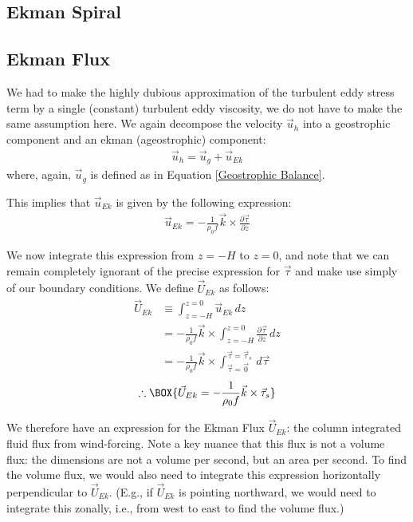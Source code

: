 \subsection{Ekman Spiral}



\subsection{Ekman Flux}

We had to make the highly dubious approximation of the turbulent eddy stress term by a single (constant) turbulent eddy viscosity, we do not have to make the same assumption here. We again decompose the velocity $\vec{u}_h$ into a geostrophic component and an ekman (ageostrophic) component:
\begin{align*}
    \vec{u}_h = \vec{u}_g + \vec{u}_{Ek}
\end{align*}
where, again, $\vec{u}_g$ is defined as in Equation \ref{Geostrophic Balance}.

This implies that $\vec{u}_{Ek}$ is given by the following expression:
\begin{align*}
    \vec{u}_{Ek} = - \frac{1}{\rho_0 f}\vec{k}\times\frac{\partial \vec{\tau}}{\partial z}
\end{align*}

We now integrate this expression from $z=-H$ to $z=0$, and note that we can remain completely ignorant of the precise expression for $\vec{\tau}$ and make use simply of our boundary conditions. We define $\vec{U}_{Ek}$ as follows:
\begin{align*}
    \vec{U}_{Ek}&\equiv
    \int_{z=-H}^{z=0}\vec{u}_{Ek}\, dz
    \\
    &=
    -\frac{1}{\rho_0 f}\vec{k}\times\int_{z=-H}^{z=0}\frac{\partial \vec{\tau}}{\partial z}\, dz
    \\
    &=
    -\frac{1}{\rho_0 f}\vec{k}\times\int_{\vec{\tau}=\vec{0}}^{\vec{\tau}=\vec{\tau}_s}\,d\vec{\tau}
\end{align*}
\begin{gather}
    \therefore\BOX{
        \vec{U}_{Ek}=-\frac{1}{\rho_0 f}\vec{k}\times\vec{\tau}_s
    }
\end{gather}

We therefore have an expression for the Ekman Flux $\vec{U}_{Ek}$: the column integrated fluid flux from wind-forcing. Note a key nuance that this flux is not a volume flux: the dimensions are not a volume per second, but an area per second. To find the volume flux, we would also need to integrate this expression horizontally perpendicular to $\vec{U}_{Ek}$. (E.g., if $\vec{U}_{Ek}$ is pointing northward, we would need to integrate this zonally, i.e., from west to east to find the volume flux.)


